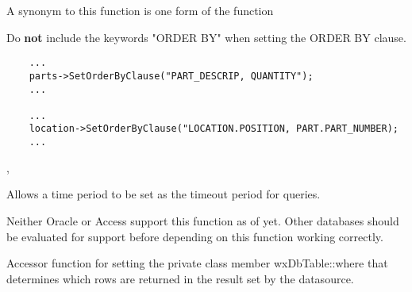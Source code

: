 A synonym to this function is one form of the function 




Do {\bf not} include the keywords "ORDER BY" when setting the ORDER BY clause.


\begin{verbatim}
    ...
    parts->SetOrderByClause("PART_DESCRIP, QUANTITY");
    ...

    ...
    location->SetOrderByClause("LOCATION.POSITION, PART.PART_NUMBER);
    ...
\end{verbatim}


,

\label{wxdbtablesetquerytimeout}


Allows a time period to be set as the timeout period for queries.




Neither Oracle or Access support this function as of yet.  Other databases
should be evaluated for support before depending on this function working
correctly.

\label{wxdbtablesetwhereclause}


Accessor function for setting the private class member wxDbTable::where
that determines which rows are returned in the result set by the datasource.

